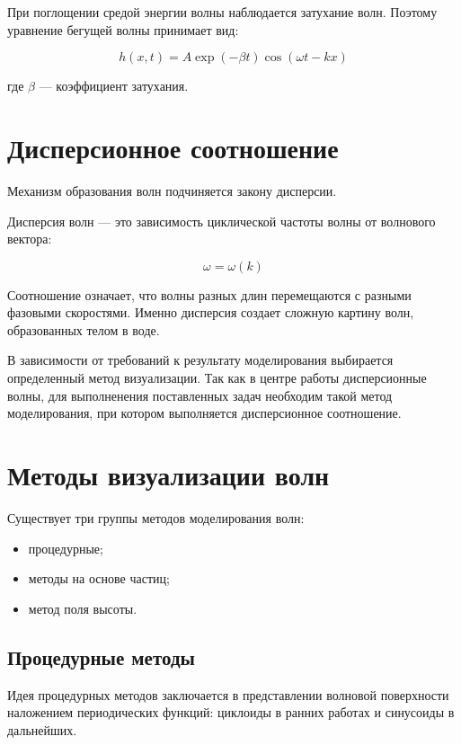 При поглощении средой энергии волны наблюдается затухание волн. Поэтому уравнение бегущей волны принимает вид:

\begin{equation}
    \label{solution-wave-eq3}
    h(x,t) = A \exp(-\beta t) \cos (\omega t - kx)
\end{equation}

где $\beta$ --- коэффициент затухания.

\section{Дисперсионное соотношение}

Механизм образования волн подчиняется закону дисперсии.

Дисперсия волн --- это зависимость циклической частоты волны от волнового вектора:

\begin{equation}
    \label{dispersion}
    \omega = \omega (k)
\end{equation}

Соотношение означает, что волны разных длин перемещаются с разными фазовыми скоростями. Именно дисперсия создает сложную картину волн, образованных телом в воде.

В зависимости от требований к результату моделирования выбирается определенный метод визуализации. Так как в центре работы дисперсионные волны, для выполненения поставленных задач необходим такой метод моделирования, при котором выполняется дисперсионное соотношение.

\section{Методы визуализации волн}

Существует три группы методов моделирования волн:

\begin{itemize}
    \item процедурные;
    \item методы на основе частиц;
    \item метод поля высоты.
\end{itemize}

\subsection{Процедурные методы}

Идея процедурных методов заключается в представлении волновой поверхности наложением периодических функций: циклоиды в ранних работах и синусоиды в дальнейших. 

